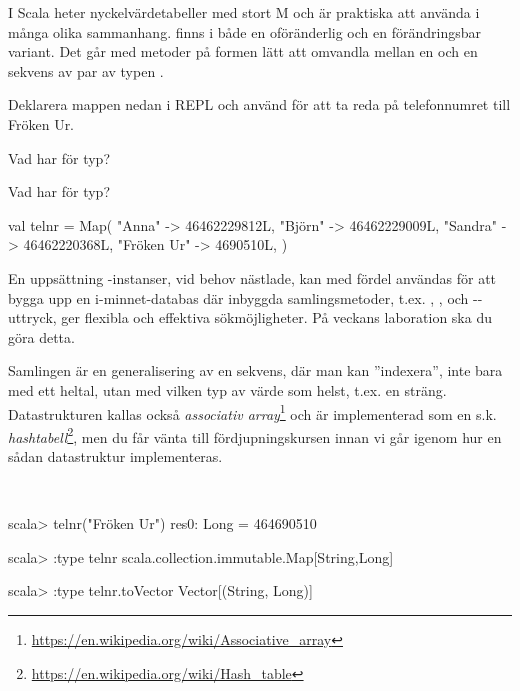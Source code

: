 I Scala heter nyckelvärdetabeller  med stort M och är praktiska att använda i många olika sammanhang.  finns i både en oföränderlig och en förändringsbar variant. Det går med metoder på formen  lätt att omvandla mellan en  och en sekvens av par av typen .

\Subtask Deklarera mappen  nedan i REPL och använd  för att ta reda på telefonnumret till Fröken Ur.

\Subtask Vad har  för typ?

\Subtask Vad har  för typ?

\begin{Code}
val telnr = Map(
  "Anna"     -> 46462229812L,
  "Björn"     -> 46462229009L,
  "Sandra"    -> 46462220368L,
  "Fröken Ur" -> 4690510L,
)
\end{Code}
En uppsättning -instanser, vid behov nästlade, kan med fördel användas för att bygga upp en i-minnet-databas där inbyggda samlingsmetoder, t.ex. , , och --uttryck, ger flexibla och effektiva sökmöjligheter. På veckans laboration ska du göra detta.

Samlingen  är en generalisering av en sekvens, där man kan ''indexera'', inte bara med ett heltal, utan med vilken typ av värde som helst, t.ex. en sträng. Datastrukturen  kallas också \emph{associativ array}\footnote{\href{https://en.wikipedia.org/wiki/Associative_array}{https://en.wikipedia.org/wiki/Associative\_array}} och är implementerad som en s.k. \emph{hashtabell}\footnote{\href{https://en.wikipedia.org/wiki/Hash_table}{https://en.wikipedia.org/wiki/Hash\_table}}, men du får vänta till fördjupningskursen innan vi går igenom hur en sådan datastruktur implementeras.

\SOLUTION

\TaskSolved \what~

\begin{REPL}
scala> telnr("Fröken Ur")
res0: Long = 464690510

scala> :type telnr
scala.collection.immutable.Map[String,Long]

scala> :type telnr.toVector
Vector[(String, Long)]
\end{REPL}

\QUESTEND




